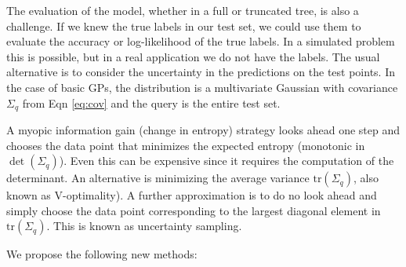 \documentclass[prd,nofootbib,floatfix,11pt,tightenlines,nofootinbib]{revtex4}
\begin{document}
The evaluation of the model, whether in a full or truncated tree, is also a
challenge.  If we knew the true labels in our test set, we could use them
to evaluate the accuracy or log-likelihood of the true labels.  In a
simulated problem this is possible, but in a real application we do not
have the labels.  The usual alternative is to consider the uncertainty in
the predictions on the test points.  In the case of basic GPs, the
distribution is a multivariate Gaussian with covariance $\Sigma_q$ from
Eqn \ref{eq:cov} and the query is the entire test set.

A myopic information gain (change in entropy) strategy looks ahead one step
and chooses the data point that minimizes the expected entropy (monotonic
in $\det(\Sigma_q)$).  Even this can be expensive since it requires the
computation of the determinant.  An alternative is minimizing the average
variance $\text{tr}(\Sigma_q)$, also known as V-optimality).  A further
approximation is to do no look ahead and simply choose the data point
corresponding to the largest diagonal element in $\text{tr}(\Sigma_q)$.  This is
known as uncertainty sampling.

We propose the following new methods:
\end{document}
